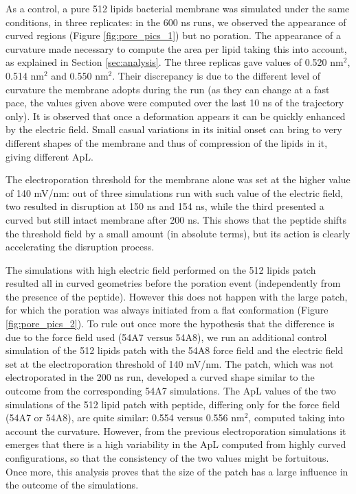 As a control, a pure 512 lipids bacterial membrane was simulated under the same conditions, in three replicates: in the 600 ns runs, we observed the appearance of curved regions (Figure \ref{fig:pore_pics_1}) but no poration.
%
The appearance of a curvature made necessary to compute the area per lipid taking this into account, as explained in Section \ref{sec:analysis}. The three replicas gave values of 0.520 nm$^2$, 0.514 nm$^2$ and 0.550 nm$^2$. Their discrepancy is due to the different level of curvature the membrane adopts during the run (as they can change at a fast pace, the values given above were computed over the last 10 ns of the trajectory only).
%
It is observed that once a deformation appears it can be quickly enhanced by the electric field. Small casual variations in its initial onset can bring to very different shapes of the membrane and thus of compression of the lipids in it, giving different ApL.

The electroporation threshold for the membrane alone was set at the higher value of 140 mV/nm: out of three simulations run with such value of the electric field, two resulted in disruption at 150 ns and 154 ns, while the third presented a curved but still intact membrane after 200 ns.
%
This shows that the peptide shifts the threshold field by a small amount (in absolute terms), but its action is clearly accelerating the disruption process.

The simulations with high electric field performed on the 512 lipids patch resulted all in curved geometries before the poration event (independently from the presence of the peptide). However this does not happen with the large patch, for which the poration was always initiated from a flat conformation (Figure \ref{fig:pore_pics_2}).
%
To rule out once more the hypothesis that the difference is due to the force field used (54A7 versus 54A8), we run an additional control simulation of the 512 lipids patch with the 54A8 force field and the electric field set at the electroporation threshold of 140 mV/nm. The patch, which was not electroporated in the 200 ns run, developed a curved shape similar to the outcome from the corresponding 54A7 simulations.
%
The ApL values of the two simulations of the 512 lipid patch with peptide, differing only for the force field (54A7 or 54A8), are quite similar: 0.554 versus 0.556 nm$^2$, computed taking into account the curvature.
%
However, from the previous electroporation simulations it emerges that there is a high variability in the ApL computed from highly curved configurations, so that the consistency of the two values might be fortuitous.
%
Once more, this analysis proves that the size of the patch has a large influence in the outcome of the simulations.

